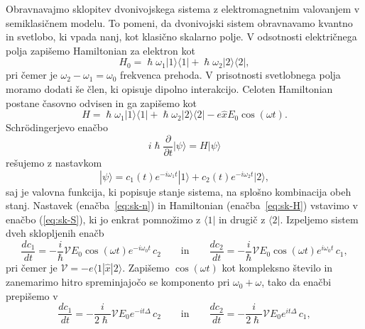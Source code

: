 Obravnavajmo sklopitev dvonivojskega sistema z elektromagnetnim valovanjem 
v semiklasičnem modelu. 
To pomeni, da dvonivojski sistem obravnavamo kvantno in 
svetlobo, ki vpada nanj, kot klasično skalarno polje. 
V odsotnosti električnega polja zapišemo Hamiltonian za elektron kot
\begin{equation}
H_0 = \hslash \omega_1 |1\rangle \langle1| + \hslash \omega_2 |2\rangle \langle2|,
\end{equation}
pri čemer je $\omega_2- \omega_1 = \omega_0$ frekvenca prehoda. V prisotnosti 
svetlobnega polja moramo dodati še člen, ki opisuje dipolno interakcijo. Celoten
Hamiltonian postane časovno odvisen in ga zapišemo kot
\begin{equation}
H = \hslash \omega_1 |1\rangle \langle1| + \hslash \omega_2 |2\rangle \langle2|
-e\hat{x}E_0 \cos (\omega t).
\label{eq:sk-H}
\end{equation}
Schr\"odingerjevo enačbo
\begin{equation}
i \hslash \frac{\partial}{\partial t}|\psi\rangle = H|\psi\rangle
\label{eq:sk-S}
\end{equation}
rešujemo z nastavkom
\begin{equation}
|\psi\rangle = c_1(t)e^{-i \omega_1t}|1\rangle + c_2(t)e^{-i \omega_2t}|2\rangle,
\label{eq:sk-n}
\end{equation}
saj je valovna funkcija, ki popisuje stanje sistema, na splošno
kombinacija obeh stanj. Nastavek (enačba~\ref{eq:sk-n}) in Hamiltonian 
(enačba~\ref{eq:sk-H}) vstavimo v enačbo (\ref{eq:sk-S}), ki jo enkrat pomnožimo 
z $\langle1|$ in drugič z $\langle2|$. Izpeljemo sistem dveh sklopljenih enačb
\begin{equation}
\frac{d c_1}{dt}=-\frac{i}{\hslash} \mathcal{V} E_0\cos (\omega t) e^{-i\omega_0 t}\, c_2 
\qquad \mathrm{in} \qquad
\frac{d c_2}{dt}=-\frac{i}{\hslash} \mathcal{V} E_0\cos (\omega t) e^{i\omega_0 t}\, c_1,
\label{eq:c1c2}
\end{equation}
pri čemer je $\mathcal{V} = -e\langle1|\hat{x}|2\rangle$. Zapišemo $\cos(\omega t)$ kot
kompleksno število in zanemarimo hitro spreminjajočo se komponento pri $\omega_0 + \omega$,
tako da enačbi prepišemo v 
\begin{equation}
\frac{d c_1}{dt}=-\frac{i}{2\hslash} \mathcal{V} E_0 e^{-it\Delta}\, c_2 
\qquad \mathrm{in} \qquad
\frac{d c_2}{dt}=-\frac{i}{2\hslash} \mathcal{V} E_0 e^{it\Delta}\, c_1,
\label{eq:rabi2}
\end{equation}
